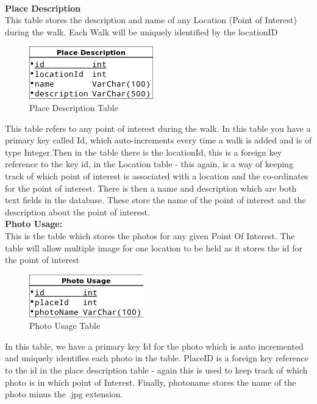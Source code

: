 \documentclass[12pt]{article}
\begin{document}
	~\\
	
	\indent\textbf{Place Description}~\\
	This table stores the description and name of any Location (Point of Interest) during the walk. Each Walk will be uniquely identified by the locationID
	\begin{figure}[htp]
\centering
\includegraphics[scale=0.60]{Final_report/PlaceDescription.png}
\caption{Place Description Table}
\label{Place Description Table}
\end{figure}
This table refers to any point of interest during the walk. In this table you have a primary key called Id, which auto-increments every time a walk is added and is of type Integer.Then in the table there is the locationId, this is a foreign key reference to the key id, in the Location table - this again, is a way of keeping track of which point of interest is associated with a location and the co-ordinates for the point of interest. There is then a name and description which are both text fields in the database. These store the name of the point of interest and the description about the point of interest.
	~\\
	\indent\textbf{Photo Usage:}~\\
	This is the table which stores the photos for any given Point Of Interest. The table will allow multiple image for one location to be held as it stores the id for the point of interest
	\begin{figure}[htp]
\centering
\includegraphics[scale=0.70]{Final_report/Photo_Usage.png}
\caption{Photo Usage Table}
\label{Photo Usage Table}
\end{figure}
In this table, we have a primary key Id for the photo which is auto incremented and uniquely identifies each photo in the table. PlaceID is a foreign key reference to the id in the place description table - again this is used to keep track of which photo is in which point of Interest. Finally, photoname stores the name of the photo minus the .jpg extension.
\end{document}
